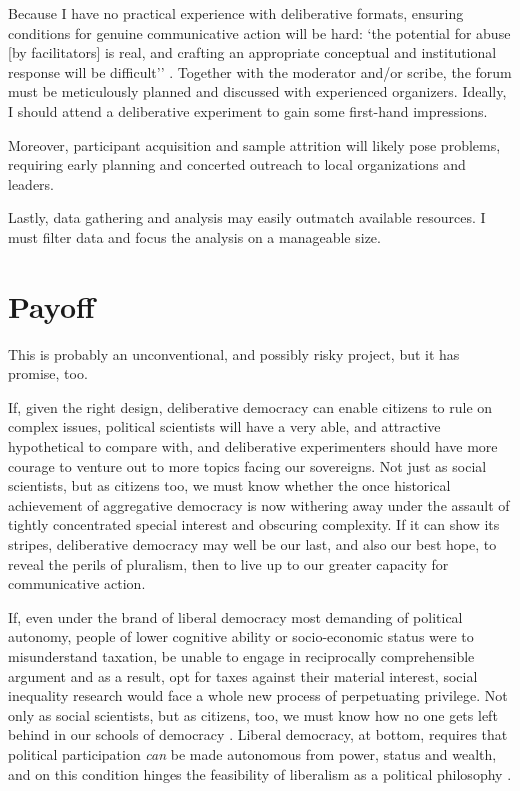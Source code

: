 Because I have no practical experience with deliberative formats, ensuring conditions for genuine communicative action will be hard:
`the potential for abuse [by facilitators] is real, and crafting an appropriate conceptual and institutional response will be difficult'' \citep[25]{GutmannThompson-2004-aa}.
Together with the moderator and/or scribe, the forum must be meticulously planned and discussed with experienced organizers.
Ideally, I should attend a deliberative experiment to gain some first-hand impressions.

Moreover, participant acquisition and sample attrition will likely pose problems, requiring early planning and concerted outreach to local organizations and leaders.

Lastly, data gathering and analysis may easily outmatch available resources.
I must filter data and focus the analysis on a manageable size.

\section{Payoff}
This is probably an unconventional, and possibly risky project, but it has promise, too.

If, given the right design, deliberative democracy can enable citizens to rule on complex issues, political scientists will have a very able, and attractive hypothetical to compare with, and deliberative experimenters should have more courage to venture out to more topics facing our sovereigns.
Not just as social scientists, but as citizens too, we must know whether the once historical achievement of aggregative democracy is now withering away under the assault of tightly concentrated special interest and obscuring complexity.
If it can show its stripes, deliberative democracy may well be our last, and also our best hope, to reveal the perils of pluralism, then to live up to our greater capacity for communicative action.

If, even under the brand of liberal democracy most demanding of political autonomy, people of lower cognitive ability or socio-economic status were to misunderstand taxation, be unable to engage in reciprocally comprehensible argument and as a result, opt for taxes against their material interest, social inequality research would face a whole new process of perpetuating privilege.
Not only as social scientists, but as citizens, too, we must know how no one gets left behind in our schools of democracy \citep{DeTocqueville1840,Rosenberg-2002-aa}.
Liberal democracy, at bottom, requires that political participation \emph{can} be made autonomous from power, status and wealth, and on this condition hinges the feasibility of liberalism as a political philosophy \citep[K1431]{GutmannThompson-2004-aa}.

